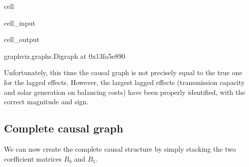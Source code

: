 \documentclass[letterpaper,10pt,english]{jupyterBook}
\begin{document}
\begin{sphinxuseclass}{cell}\begin{sphinxVerbatimInput}

\begin{sphinxuseclass}{cell_input}
\begin{sphinxVerbatim}[commandchars=\\\{\}]
  
\PYG{p}{[}\PYG{p}{]}  
\end{sphinxVerbatim}

\end{sphinxuseclass}\end{sphinxVerbatimInput}
\begin{sphinxVerbatimOutput}

\begin{sphinxuseclass}{cell_output}
\begin{sphinxVerbatim}[commandchars=\\\{\}]
\PYGZlt{}graphviz.graphs.Digraph at 0x13fa5e890\PYGZgt{}
\end{sphinxVerbatim}

\end{sphinxuseclass}\end{sphinxVerbatimOutput}

\end{sphinxuseclass}
\sphinxAtStartPar
Unfortunately, this time the causal graph is not precisely equal to the true one for the lagged effects. However, the largest lagged effects (transmission capacity and solar generation on balancing costs) have been properly identified, with the correct magnitude and sign.


\subsection{Complete causal graph}
\label{\detokenize{notebooks/semiparametric_varlingam:complete-causal-graph}}
\sphinxAtStartPar
We can now create the complete causal structure by simply stacking the two coefficient matrices \(B_0\) and \(B_1\).
\end{document}
